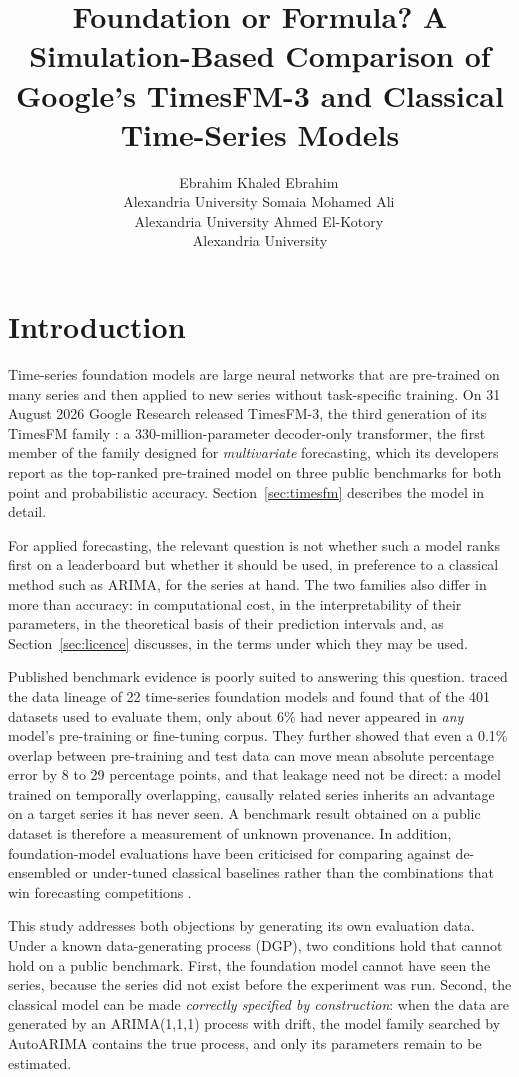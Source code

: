 \documentclass[article]{ajs}
\author{Ebrahim Khaled Ebrahim\,\orcidlink{0009-0006-7839-8778}\\ Alexandria University \And
        Somaia Mohamed Ali\,\orcidlink{0009-0002-0940-8451}\\ Alexandria University \AND
        Ahmed El-Kotory\,\orcidlink{0009-0000-1485-0768}\\ Alexandria University}
\title{Foundation or Formula? A Simulation-Based Comparison of Google's TimesFM-3 and
       Classical Time-Series Models}
\providecommand{\sectionref}[1]{Section~\ref{#1}}
\begin{document}
\section{Introduction}
\label{sec:intro}

Time-series foundation models are large neural networks that are pre-trained on many series
and then applied to new series without task-specific training. On 31 August 2026 Google Research
released TimesFM-3, the third generation of its TimesFM family \citep{timesfm3blog}: a
330-million-parameter decoder-only transformer, the first member of the family designed for
\emph{multivariate} forecasting, which its developers report as the top-ranked pre-trained model
on three public benchmarks for both point and probabilistic accuracy. \sectionref{sec:timesfm}
describes the model in detail.

For applied forecasting, the relevant question is not whether such a model ranks first on a
leaderboard but whether it should be used, in preference to a classical method such as ARIMA, for
the series at hand. The two families also differ in more than accuracy: in computational cost, in
the interpretability of their parameters, in the theoretical basis of their prediction intervals
and, as \sectionref{sec:licence} discusses, in the terms under which they may be used.

Published benchmark evidence is poorly suited to answering this question. \citet{meyer2025leakage} traced the data lineage of 22 time-series
foundation models and found that of the 401 datasets used to evaluate them, only about 6\%
had never appeared in \emph{any} model's pre-training or fine-tuning corpus. They further
showed that even a 0.1\% overlap between pre-training and test data can move mean absolute
percentage error by 8 to 29 percentage points, and that leakage need not be direct: a model
trained on temporally overlapping, causally related series inherits an advantage on a target
series it has never seen. A benchmark result obtained on a public dataset is therefore a
measurement of unknown provenance. In addition, foundation-model evaluations have been
criticised for comparing against de-ensembled or under-tuned classical baselines rather
than the combinations that win forecasting competitions \citep{makridakis2020m4}.

This study addresses both objections by generating its own evaluation data. Under a known
data-generating process (DGP), two conditions hold that cannot hold on a public benchmark.
First, the foundation model cannot have seen the series, because the series did not exist before
the experiment was run. Second, the classical model can be made \emph{correctly specified by
construction}: when the data are generated by an ARIMA(1,1,1) process with drift, the model
family searched by AutoARIMA contains the true process, and only its parameters remain to be
estimated.
\end{document}
